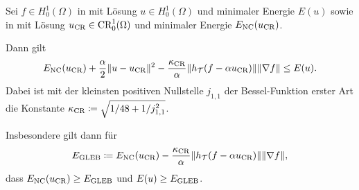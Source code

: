 \begin{theorem}
  \label{thm:gleb}
  Sei $f\in H^1_0(\Omega)$ in  mit Lösung 
  $u\in H^1_0(\Omega)$ und minimaler Energie $E(u)$ sowie in
   mit Lösung $u_\textup{CR}\in \textup{CR}^1_0(\Omega)$ und
  minimaler Energie $E_\textup{NC}(u_\textup{CR})$.

  Dann gilt
  \begin{align*}
    E_\textup{NC}(u_\textup{CR})+\frac{\alpha}{2}\Vert u-u_\textup{CR}\Vert^2
    -\frac{\kappa_{\textup{CR}}}{\alpha}\Vert
    h_{\mathcal{T}}(f-\alpha u_\textup{CR})\Vert \Vert\nabla f\Vert\leq E(u).
  \end{align*}
  Dabei ist mit der kleinsten positiven Nullstelle $j_{1,1}$ der
  Bessel-Funktion erster Art die Konstante
  $\kappa_{\textup{CR}}\coloneqq\sqrt{1/48+1/j_{1,1}^2}$.

  Insbesondere gilt dann für 
  \begin{align}
    \label{eq:gleb}
    E_\textup{GLEB} 
    \coloneqq 
    E_\textup{NC}(u_\textup{CR}) - \frac{\kappa_{\textup{CR}}}{\alpha}\Vert h_{\mathcal{T}}(f-\alpha u_\textup{CR})\Vert
    \Vert \nabla f\Vert,
  \end{align}
    dass $E_\textup{NC}(u_\textup{CR})\geq E_\textup{GLEB}$ und $E(u)\geq E_\textup{GLEB}$.
\end{theorem}
